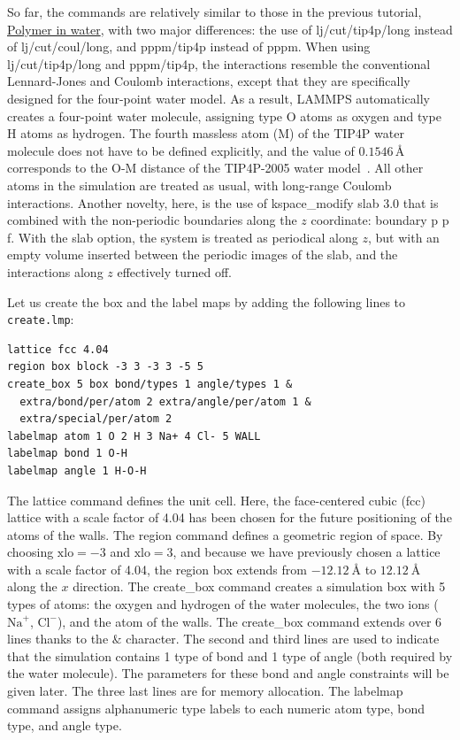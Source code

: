 \documentclass[9pt,tutorial]{livecoms}
\newcommand{\lmpcmd}[1]{\hspace{0pt}\colorbox{listing}{\textcolor{command}{\small{#1}}}\hspace{0pt}} %
\newcommand{\flecmd}[1]{\textcolor{command}{\texttt{#1}}} %
\begin{document}
So far, the commands are relatively similar to those in the previous tutorial,
\hyperref[all-atom-label]{Polymer in water}, with two major differences: the use
of \lmpcmd{lj/cut/tip4p/long} instead of \lmpcmd{lj/cut/coul/long}, and \lmpcmd{pppm/tip4p}
instead of \lmpcmd{pppm}.  When using \lmpcmd{lj/cut/tip4p/long} and \lmpcmd{pppm/tip4p},
the interactions resemble the conventional Lennard-Jones and Coulomb interactions,
except that they are specifically designed for the four-point water model.  As a result,
LAMMPS automatically creates a four-point water molecule, assigning type O
atoms as oxygen and type H atoms as hydrogen.  The fourth massless atom (M) of the
TIP4P water molecule does not have to be defined explicitly, and the value of
$0.1546\,\text{$\text{\AA{}}$}$ corresponds to the O-M distance of the
TIP4P-2005 water model~\cite{abascal2005general}.  All other atoms in the simulation
are treated as usual, with long-range Coulomb interactions.  Another novelty, here, is
the use of \lmpcmd{kspace\_modify slab 3.0} that is combined with the non-periodic
boundaries along the $z$ coordinate: \lmpcmd{boundary p p f}.  With the \lmpcmd{slab}
option, the system is treated as periodical along $z$, but with an empty volume inserted
between the periodic images of the slab, and the interactions along $z$ effectively turned off.

Let us create the box and the label maps by adding the following lines to \flecmd{create.lmp}:
\begin{lstlisting}
lattice fcc 4.04
region box block -3 3 -3 3 -5 5
create_box 5 box bond/types 1 angle/types 1 &
  extra/bond/per/atom 2 extra/angle/per/atom 1 &
  extra/special/per/atom 2
labelmap atom 1 O 2 H 3 Na+ 4 Cl- 5 WALL
labelmap bond 1 O-H
labelmap angle 1 H-O-H
\end{lstlisting}
The \lmpcmd{lattice} command defines the unit cell.  Here, the face-centered cubic (fcc) lattice
with a scale factor of 4.04 has been chosen for the future positioning of the atoms
of the walls.  The \lmpcmd{region} command defines a geometric region of space.  By choosing
$\text{xlo}=-3$ and $\text{xlo}=3$, and because we have previously chosen a lattice with a scale
factor of 4.04, the region box extends from $-12.12~\text{\AA{}}$ to $12.12~\text{\AA{}}$
along the $x$ direction.  The \lmpcmd{create\_box} command creates a simulation box with
5 types of atoms: the oxygen and hydrogen of the water molecules, the two ions ($\text{Na}^+$,
$\text{Cl}^-$), and the atom of the walls.  The \lmpcmd{create\_box} command extends over 6
lines thanks to the $\&$ character.  The second and third lines are used to indicate that the
simulation contains 1 type of bond and 1 type of angle (both required by the water molecule).
The parameters for these bond and angle constraints will be given later.  The three last
lines are for memory allocation.  The \lmpcmd{labelmap} command assigns alphanumeric type labels
to each numeric atom type, bond type, and angle type.
\end{document}
